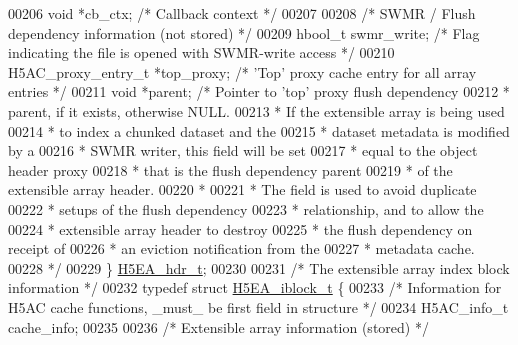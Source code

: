 \begin{DoxyCode}
00206     \textcolor{keywordtype}{void} *cb\_ctx;                       \textcolor{comment}{/* Callback context */}
00207 
00208     \textcolor{comment}{/* SWMR / Flush dependency information (not stored) */}
00209     hbool\_t swmr\_write;                 \textcolor{comment}{/* Flag indicating the file is opened with SWMR-write access */}
00210     H5AC\_proxy\_entry\_t *top\_proxy;      \textcolor{comment}{/* 'Top' proxy cache entry for all array entries */}
00211     \textcolor{keywordtype}{void} *parent;               \textcolor{comment}{/* Pointer to 'top' proxy flush dependency}
00212 \textcolor{comment}{                                         * parent, if it exists, otherwise NULL.}
00213 \textcolor{comment}{                                         * If the extensible array is being used}
00214 \textcolor{comment}{                                         * to index a chunked dataset and the}
00215 \textcolor{comment}{                                         * dataset metadata is modified by a}
00216 \textcolor{comment}{                                         * SWMR writer, this field will be set}
00217 \textcolor{comment}{                                         * equal to the object header proxy}
00218 \textcolor{comment}{                                         * that is the flush dependency parent}
00219 \textcolor{comment}{                                         * of the extensible array header.}
00220 \textcolor{comment}{                     *}
00221 \textcolor{comment}{                     * The field is used to avoid duplicate}
00222 \textcolor{comment}{                     * setups of the flush dependency }
00223 \textcolor{comment}{                     * relationship, and to allow the }
00224 \textcolor{comment}{                     * extensible array header to destroy}
00225 \textcolor{comment}{                     * the flush dependency on receipt of }
00226 \textcolor{comment}{                     * an eviction notification from the}
00227 \textcolor{comment}{                     * metadata cache.}
00228 \textcolor{comment}{                     */}
00229 \} \hyperlink{struct_h5_e_a__hdr__t}{H5EA\_hdr\_t};
00230 
00231 \textcolor{comment}{/* The extensible array index block information */}
00232 \textcolor{keyword}{typedef} \textcolor{keyword}{struct }\hyperlink{struct_h5_e_a__iblock__t}{H5EA\_iblock\_t} \{
00233     \textcolor{comment}{/* Information for H5AC cache functions, \_must\_ be first field in structure */}
00234     H5AC\_info\_t cache\_info;
00235 
00236     \textcolor{comment}{/* Extensible array information (stored) */}

\end{DoxyCode}
